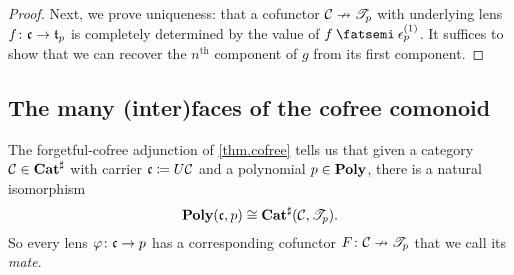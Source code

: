 \documentclass[Book-Poly]{subfiles}
\begin{document}
\begin{proof}
Next, we prove uniqueness: that a cofunctor $\mathcal{C}\nrightarrow\mathscr{T}_{p}$ with underlying lens $f\colon\mathfrak{c}\to\mathfrak{t}_p$ is completely determined by the value of $f\then\epsilon^{(1)}_p$.
It suffices to show that we can recover the $n^\text{th}$ component of $g$ from its first component.

\end{proof}



\subsection{The many (inter)faces of the cofree comonoid} \label{subsec.comon.cofree.cons.faces}

The forgetful-cofree adjunction of \cref{thm.cofree} tells us that given a category $\mathcal{C}\in\mathbf{Cat}^\sharp$ with carrier $\mathfrak{c}\coloneqq U\mathcal{C}$ and a polynomial $p\in\mathbf{Poly}$, there is a natural isomorphism
\[
    \mathbf{Poly}(\mathfrak{c},p)\cong\mathbf{Cat}^\sharp(\mathcal{C},\mathscr{T}_{p}).
\]
So every lens $\varphi\colon\mathfrak{c}\to p$ has a corresponding cofunctor $F\colon\mathcal{C}\nrightarrow\mathscr{T}_{p}$ that we call its \emph{mate}.
\end{document}
